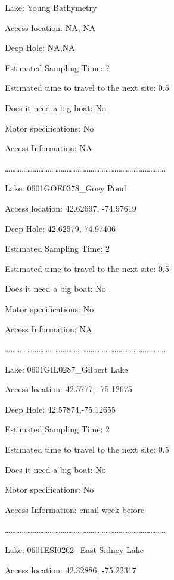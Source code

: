 \documentclass[]{article}
\begin{document}
Lake: Young Bathymetry

Access location: NA, NA

Deep Hole: NA,NA

Estimated Sampling Time: ?

Estimated time to travel to the next site: 0.5

Does it need a big boat: No

Motor specifications: No

Access Information: NA

\ldots{}\ldots{}\ldots{}\ldots{}\ldots{}\ldots{}\ldots{}\ldots{}\ldots{}\ldots{}\ldots{}\ldots{}\ldots{}\ldots{}\ldots{}\ldots{}\ldots{}\ldots{}\ldots{}\ldots{}\ldots{}\ldots{}\ldots{}\ldots{}\ldots{}\ldots{}\ldots{}\ldots{}..

Lake: 0601GOE0378\_Goey Pond

Access location: 42.62697, -74.97619

Deep Hole: 42.62579,-74.97406

Estimated Sampling Time: 2

Estimated time to travel to the next site: 0.5

Does it need a big boat: No

Motor specifications: No

Access Information: NA

\ldots{}\ldots{}\ldots{}\ldots{}\ldots{}\ldots{}\ldots{}\ldots{}\ldots{}\ldots{}\ldots{}\ldots{}\ldots{}\ldots{}\ldots{}\ldots{}\ldots{}\ldots{}\ldots{}\ldots{}\ldots{}\ldots{}\ldots{}\ldots{}\ldots{}\ldots{}\ldots{}\ldots{}..

Lake: 0601GIL0287\_Gilbert Lake

Access location: 42.5777, -75.12675

Deep Hole: 42.57874,-75.12655

Estimated Sampling Time: 2

Estimated time to travel to the next site: 0.5

Does it need a big boat: No

Motor specifications: No

Access Information: email week before

\ldots{}\ldots{}\ldots{}\ldots{}\ldots{}\ldots{}\ldots{}\ldots{}\ldots{}\ldots{}\ldots{}\ldots{}\ldots{}\ldots{}\ldots{}\ldots{}\ldots{}\ldots{}\ldots{}\ldots{}\ldots{}\ldots{}\ldots{}\ldots{}\ldots{}\ldots{}\ldots{}\ldots{}..

Lake: 0601ESI0262\_East Sidney Lake

Access location: 42.32886, -75.22317
\end{document}
